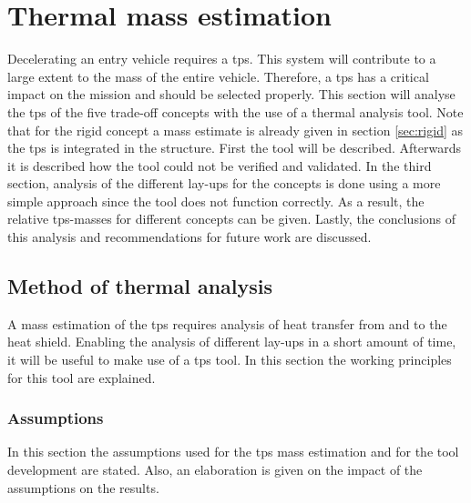 \section{Thermal mass estimation}
\label{ch:thermtool}
Decelerating an entry vehicle requires a \acrfull{tps}. This system will contribute to a large extent to the mass of the entire vehicle. Therefore, a \gls{tps} has a critical impact on the mission and should be selected properly. This section will analyse the \gls{tps} of the five trade-off concepts with the use of a thermal analysis tool. Note that for the rigid concept a mass estimate is already given in section \ref{sec:rigid} as the \gls{tps} is integrated in the structure. First the tool will be described. Afterwards it is described how the tool could not be verified and validated. In the third section, analysis of the different lay-ups for the concepts is done using a more simple approach since the tool does not function correctly. As a result, the relative \gls{tps}-masses for different concepts can be given. Lastly, the conclusions of this analysis and recommendations for future work are discussed.

\subsection{Method of thermal analysis}
A mass estimation of the \gls{tps} requires analysis of heat transfer from and to the heat shield. Enabling the analysis of different lay-ups in a short amount of time, it will be useful to make use of a \gls{tps} tool. In this section the working principles for this tool are explained.

\subsubsection{Assumptions}
In this section the assumptions used for the \gls{tps} mass estimation and for the tool development are stated. Also, an elaboration is given on the impact of the assumptions on the results.

